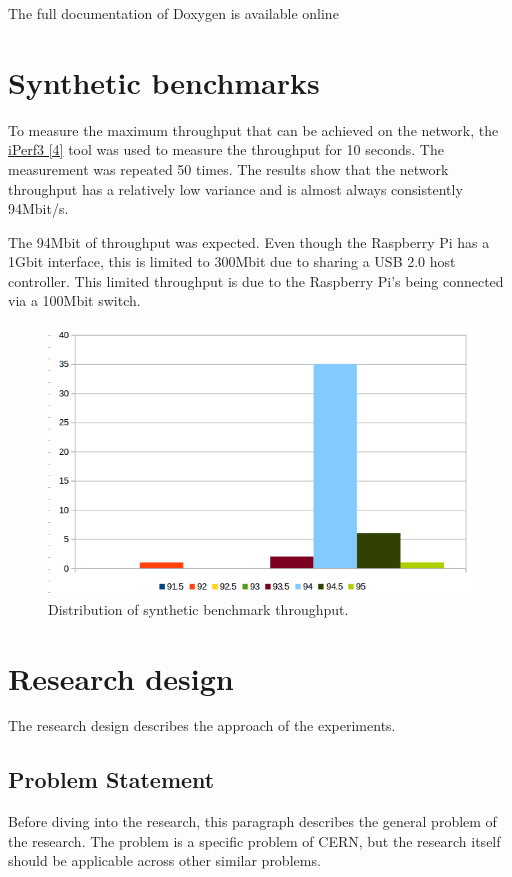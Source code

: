 \documentclass[]{article}
\begin{document}
The full documentation of Doxygen is available online \cite{doxygen}

\section{Synthetic benchmarks}
To measure the maximum throughput that can be achieved on the network, the \hyperref[sec:ref04]{iPerf3 [4]} tool was used to measure the throughput for 10 seconds. The measurement was repeated 50 times. The results show that the network throughput has a relatively low variance and is almost always consistently 94Mbit/s.

The 94Mbit of throughput was expected. Even though the Raspberry Pi has a 1Gbit interface, this is limited to 300Mbit due to sharing a USB 2.0 host controller. This limited throughput is due to the Raspberry Pi’s being connected via a 100Mbit switch.

\begin{center}
	\begin{figure}[H]
		\includegraphics[width=\textwidth]{images/network-benchmark}
		\caption{Distribution of synthetic benchmark throughput.}
		\label{fig:ssh}
	\end{figure}
\end{center}

\section{Research design}
The research design describes the approach of the experiments.

\subsection{Problem Statement}
Before diving into the research, this paragraph describes the general problem of the research. The problem is a specific problem of CERN, but the research itself should be applicable across other similar problems.
\end{document}
